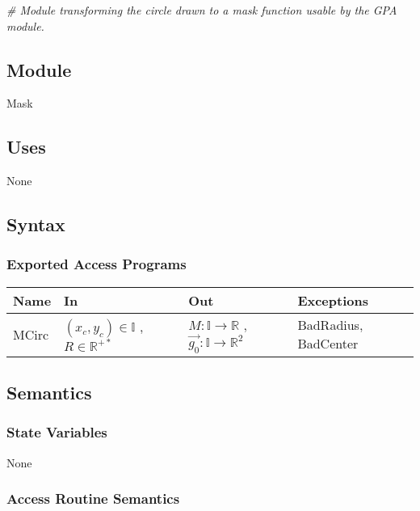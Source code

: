 \documentclass[12pt, titlepage]{article}
\begin{document}
\noindent\textit{{\#} Module transforming the circle drawn to a mask function 
usable by the GPA module.}


\subsection{Module}
Mask
\subsection{Uses}
None

\subsection{Syntax}

\subsubsection{Exported Access Programs}

\begin{center}
\begin{tabular}{p{2cm} p{4cm} p{5cm} p{3cm}}
\hline
\textbf{Name} & \textbf{In} & \textbf{Out} & \textbf{Exceptions} \\
\hline
MCirc & $(x_c,y_c) \in \mathbb{I}$ , $R \in \mathbb{R}^{+*}$ & 
$M:\mathbb{I}\rightarrow\mathbb{R}$ , $\overrightarrow{g_0} 
:\mathbb{I}\rightarrow\mathbb{R}^2$ & BadRadius, BadCenter\\
\hline
\end{tabular}
\end{center}

\subsection{Semantics}

\subsubsection{State Variables}
None

\subsubsection{Access Routine Semantics}
\end{document}
